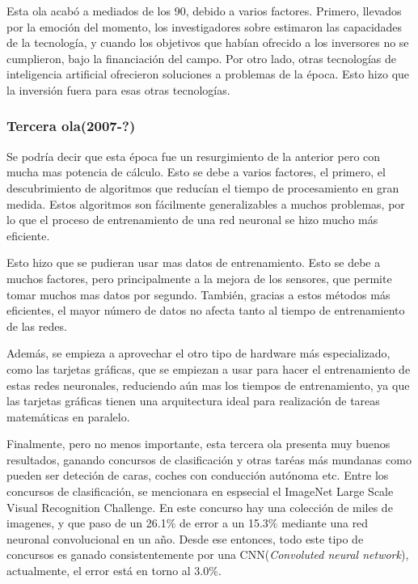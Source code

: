 \documentclass[12pt]{article}
\numberwithin{equation}{section}
\begin{document}
Esta ola acabó a mediados de los 90, debido a varios factores. Primero, llevados por la emoción del momento, los investigadores sobre estimaron las capacidades de la tecnología, y cuando los objetivos que habían ofrecido a los inversores no se cumplieron, bajo la financiación del campo. Por otro lado, otras tecnologías de inteligencia artificial ofrecieron soluciones a problemas de la época. Esto hizo que la inversión fuera para esas otras tecnologías.

\subsubsection{Tercera ola(2007-?)}
Se podría decir que esta época fue un resurgimiento de la anterior pero con mucha mas potencia de cálculo.  Esto se debe a varios factores, el primero, el descubrimiento de algoritmos que reducían el tiempo de procesamiento en gran medida\cite{doi:10.1162/neco.2006.18.7.1527}. Estos algoritmos son fácilmente generalizables a muchos problemas, por lo que el proceso de entrenamiento de una red neuronal se hizo mucho más eficiente.


Esto hizo que se pudieran usar mas datos de entrenamiento. Esto se debe a muchos factores, pero principalmente a la mejora de los sensores, que permite tomar muchos mas datos por segundo. También, gracias a estos métodos más eficientes, el mayor número de datos no afecta tanto al tiempo de entrenamiento de las redes.

Además, se empieza a aprovechar el otro tipo de hardware más especializado, como las tarjetas gráficas, que se empiezan a usar para hacer el entrenamiento de estas redes neuronales, reduciendo aún mas los tiempos de entrenamiento, ya que las tarjetas gráficas tienen una arquitectura  ideal para realización de tareas matemáticas en paralelo.

Finalmente, pero no menos importante, esta tercera ola presenta muy buenos resultados, ganando concursos de clasificación y otras taréas más mundanas como pueden ser deteción de caras, coches con conducción autónoma etc. Entre los concursos de clasificación, se mencionara en espsecial el ImageNet Large Scale Visual Recognition Challenge. En este concurso hay una colección de miles de imagenes, y que paso de un 26.1\% de error a un 15.3\%\cite{concursos} mediante una red neuronal convolucional en un año. Desde ese entonces, todo este tipo de concursos es ganado consistentemente por una CNN(\textit{Convoluted neural network}), actualmente, el error está en torno al 3.0\%.
\end{document}
